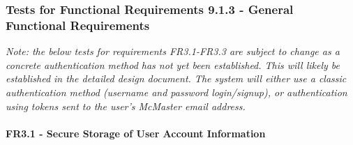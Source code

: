\documentclass[12pt, titlepage]{article}
\begin{document}
\subsubsection{Tests for Functional Requirements 9.1.3 - General Functional Requirements}

\textit{Note: the below tests for requirements FR3.1-FR3.3 are subject to change as a concrete authentication method has not yet been established. This will likely be established in the detailed design document. The system will either use a classic authentication method (username and password login/signup), or authentication using tokens sent to the user's McMaster email address.}

\paragraph{FR3.1 - Secure Storage of User Account Information}
\end{document}
